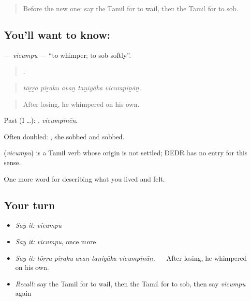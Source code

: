 \label{lesson:TA-C458-vicumpu}



\begin{quote}
Before the new one: say the Tamil for to wail, then the Tamil for to sob.
\end{quote}

\subsection*{You'll want to know: }
\textbf{} — \emph{vicumpu} — \textquotedblleft{}to whimper; to sob softly\textquotedblright{}.

\begin{quote}
    .
\end{quote}

\begin{quote}
\emph{tōṟṟa piṟaku avaṉ taṉiyāka vicumpiṉāṉ.}
\end{quote}

\begin{quote}
After losing, he whimpered on his own.
\end{quote}

Past (I …): , \emph{vicumpiṉēṉ}.

Often doubled:   , she sobbed and sobbed.

\begin{cousinweb}
\textbf{} (\emph{vicumpu}) is a Tamil verb whose origin is not settled; DEDR has no entry for this sense.
\end{cousinweb}

\begin{grammarlens}[title={What you've built}]
One more word for describing what you lived and felt.
\end{grammarlens}

\subsection*{Your turn}
\begin{itemize}
\raggedright
  \item \emph{Say it:} \emph{vicumpu}
  \item \emph{Say it:} \emph{vicumpu}, once more
  \item \emph{Say it:} \emph{tōṟṟa piṟaku avaṉ taṉiyāka vicumpiṉāṉ.} — After losing, he whimpered on his own.
  \item \emph{Recall:} say the Tamil for to wail, then the Tamil for to sob, then say \emph{vicumpu} again
\end{itemize}

